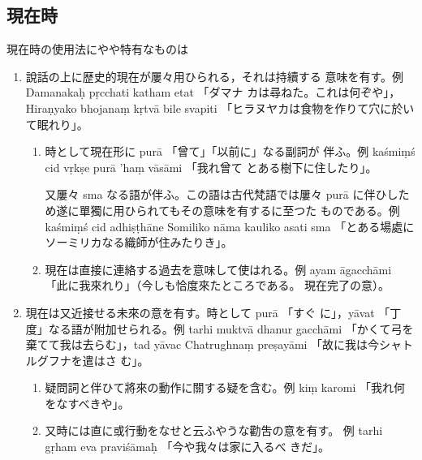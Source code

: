 \subsection{現在時}
\numberParagraph
現在時の使用法にやや特有なものは
\begin{enumerate}[label=(\arabic*)]
\item 說話の上に歴史的現在が屢々用ひられる，それは持續する
意味を有す。例 Damanakaḥ pṛcchati katham etat 「ダマナ
カは尋ねた。これは何ぞや」，Hiraṇyako bhojanaṃ kṛtvā bile
svapiti 「ヒラヌヤカは食物を作りて穴に於いて眠れり」。
\begin{enumerate}[label=(\alph*)]
\item 時として現在形に purā 「曾て」「以前に」なる副詞が
伴ふ。例 kaśmiṃś cid vṛkṣe purā 'haṃ vāsāmi 「我れ曾て
とある樹下に住したり」。

又屢々 sma なる語が伴ふ。この語は古代梵語では屢々 purā
に伴ひしため遂に單獨に用ひられてもその意味を有するに至つた
ものである。例 kaśmiṃś cid adhiṣṭhāne Somiliko nāma kauliko
asati sma 「とある場處にソーミリカなる織師が住みたりき」。
\item 現在は直接に連絡する過去を意味して使はれる。例
ayam āgacchāmi 「此に我來れり」（今しも恰度來たところである。
現在完了の意）。
\end{enumerate}
\item 現在は又近接せる未來の意を有す。時として purā 「すぐ
に」，yāvat 「丁度」なる語が附加せられる。例 tarhi muktvā
dhanur gacchāmi 「かくて弓を棄てて我は去らむ」，tad yāvac
Chatrughnaṃ preṣayāmi 「故に我は今シャトルグフナを遣はさ
む」。
\begin{enumerate}[label=(\alph*)]
\item 疑問詞と伴ひて將來の動作に關する疑を含む。例 kiṃ
karomi 「我れ何をなすべきや」。
\item 又時には直に或行動をなせと云ふやうな勸吿の意を有す。
例 tarhi gṛham eva praviśāmaḥ 「今や我々は家に入るべ
きだ」。
\end{enumerate}
\end{enumerate}

